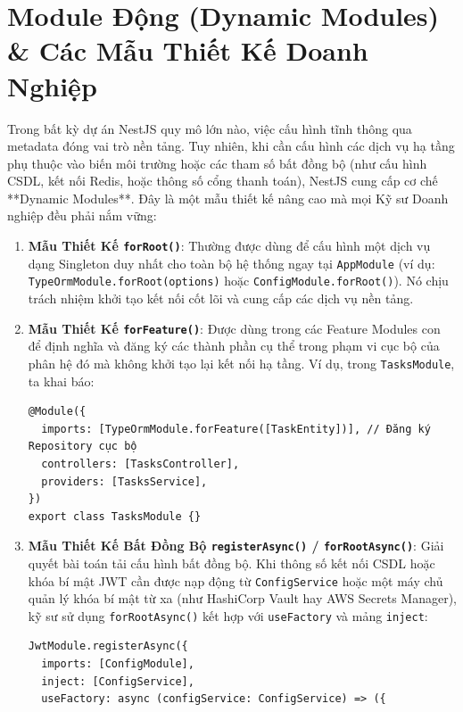 \documentclass[12pt,a4paper,oneside]{book}
\begin{document}
\section{Module Động (Dynamic Modules) \& Các Mẫu Thiết Kế Doanh Nghiệp}
Trong bất kỳ dự án NestJS quy mô lớn nào, việc cấu hình tĩnh thông qua metadata đóng vai trò nền tảng. Tuy nhiên, khi cần cấu hình các dịch vụ hạ tầng phụ thuộc vào biến môi trường hoặc các tham số bất đồng bộ (như cấu hình CSDL, kết nối Redis, hoặc thông số cổng thanh toán), NestJS cung cấp cơ chế **Dynamic Modules**. Đây là một mẫu thiết kế nâng cao mà mọi Kỹ sư Doanh nghiệp đều phải nắm vững:

\begin{enumerate}
  \item \textbf{Mẫu Thiết Kế \texttt{forRoot()}}: Thường được dùng để cấu hình một dịch vụ dạng Singleton duy nhất cho toàn bộ hệ thống ngay tại \texttt{AppModule} (ví dụ: \texttt{TypeOrmModule.forRoot(options)} hoặc \texttt{ConfigModule.forRoot()}). Nó chịu trách nhiệm khởi tạo kết nối cốt lõi và cung cấp các dịch vụ nền tảng.
  \item \textbf{Mẫu Thiết Kế \texttt{forFeature()}}: Được dùng trong các Feature Modules con để định nghĩa và đăng ký các thành phần cụ thể trong phạm vi cục bộ của phân hệ đó mà không khởi tạo lại kết nối hạ tầng. Ví dụ, trong \texttt{TasksModule}, ta khai báo:
\begin{codebox}
\begin{Verbatim}[fontsize=\small]
@Module({
  imports: [TypeOrmModule.forFeature([TaskEntity])], // Đăng ký Repository cục bộ
  controllers: [TasksController],
  providers: [TasksService],
})
export class TasksModule {}
\end{Verbatim}
\end{codebox}
  \item \textbf{Mẫu Thiết Kế Bất Đồng Bộ \texttt{registerAsync()} / \texttt{forRootAsync()}}: Giải quyết bài toán tải cấu hình bất đồng bộ. Khi thông số kết nối CSDL hoặc khóa bí mật JWT cần được nạp động từ \texttt{ConfigService} hoặc một máy chủ quản lý khóa bí mật từ xa (như HashiCorp Vault hay AWS Secrets Manager), kỹ sư sử dụng \texttt{forRootAsync()} kết hợp với \texttt{useFactory} và mảng \texttt{inject}:
\begin{codebox}
\begin{Verbatim}[fontsize=\small]
JwtModule.registerAsync({
  imports: [ConfigModule],
  inject: [ConfigService],
  useFactory: async (configService: ConfigService) => ({

\end{Verbatim}
\end{codebox}
\end{enumerate}
\end{document}
